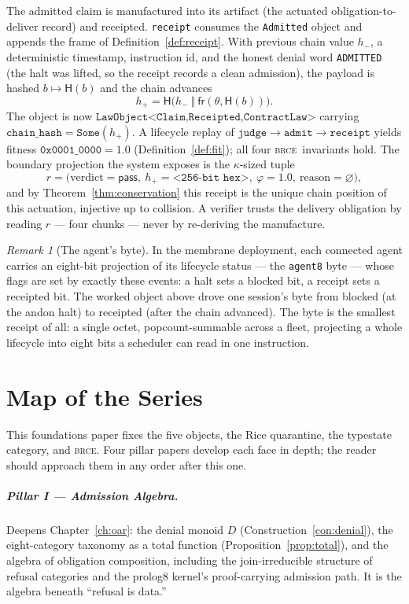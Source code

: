 \documentclass[11pt,oneside]{book}
\theoremstyle{definition}
\theoremstyle{plain}
\theoremstyle{remark}
\newtheorem*{remark}{Remark}
\newcommand{\chainH}{\mathsf{H}}               %
\newcommand{\CL}{\kappa}                       %
\newcommand{\Fitness}{\varphi}
\newcommand{\BRCE}{\textsc{brce}}
\newcommand{\code}[1]{\texttt{#1}}
\begin{document}
The admitted claim is manufactured into its artifact (the actuated obligation-to-deliver
record) and receipted. \code{receipt} consumes the \code{Admitted} object and appends the
frame of Definition~\ref{def:receipt}. With previous chain value $h_{-}$, a deterministic
timestamp, instruction id, and the honest denial word \code{ADMITTED} (the halt was lifted,
so the receipt records a clean admission), the payload is hashed
$b\mapsto\chainH(b)$ and the chain advances
\[
h_{+}=\chainH\bigl(h_{-}\ \Vert\ \mathsf{fr}(\theta,\chainH(b))\bigr).
\]
The object is now $\code{LawObject<Claim,Receipted,ContractLaw>}$ carrying
$\code{chain\_hash}=\code{Some}(h_{+})$. A lifecycle replay of
$\code{judge}\to\code{admit}\to\code{receipt}$ yields fitness $\code{0x0001\_0000}=1.0$
(Definition~\ref{def:fit}); all four \BRCE\ invariants hold. The boundary projection the
system exposes is the $\CL$-sized tuple
\[
r=\bigl(\text{verdict}=\textsf{pass},\ h_{+}=\texttt{<256-bit hex>},\ \Fitness=1.0,\
\text{reason}=\varnothing\bigr),
\]
and by Theorem~\ref{thm:conservation} this receipt is the unique chain position of this
actuation, injective up to collision. A verifier trusts the delivery obligation by reading
$r$ --- four chunks --- never by re-deriving the manufacture.

\begin{remark}[The agent's byte]
In the membrane deployment, each connected agent carries an eight-bit projection of its
lifecycle status --- the \code{agent8} byte --- whose flags are set by exactly these events:
a halt sets a \textsf{blocked} bit, a receipt sets a \textsf{receipted} bit. The worked
object above drove one session's byte from \textsf{blocked} (at the andon halt) to
\textsf{receipted} (after the chain advanced). The byte is the smallest receipt of all: a
single octet, popcount-summable across a fleet, projecting a whole lifecycle into eight
bits a scheduler can read in one instruction.
\end{remark}

\chapter{Map of the Series}
\label{ch:map}

This foundations paper fixes the five objects, the Rice quarantine, the typestate category,
and \BRCE. Four pillar papers develop each face in depth; the reader should approach them in
any order after this one.

\paragraph{Pillar I --- Admission Algebra.}
Deepens Chapter~\ref{ch:oar}: the denial monoid $D$ (Construction~\ref{con:denial}), the
eight-category taxonomy as a total function (Proposition~\ref{prop:total}), and the algebra
of obligation composition, including the join-irreducible structure of refusal categories and
the prolog8 kernel's proof-carrying admission path. It is the algebra beneath ``refusal is
data.''
\end{document}
